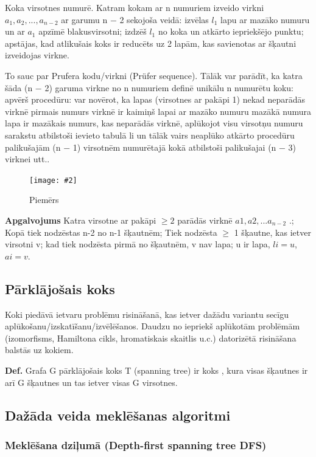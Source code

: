 \documentclass{article}
\newcommand{\illustration}[3]{
	\begin{figure}[H]
		\centering	
		\texttt{[image: \#2]}
		\caption{#3}
	\end{figure}
}
\begin{document}
Koka virsotnes numurē. Katram kokam ar n numuriem izveido virkni $a_1 , a_2 ,...,a_{n−2}$ ar garumu n − 2 sekojoša veidā: izvēlas $l_1$ lapu ar mazāko numuru un ar $a_1$ apzīmē blakusvirsotni; izdzēš $l_1$ no koka un atkārto iepriekšējo punktu; apstājas, kad atlikušais koks ir reducēts uz 2 lapām, kas savienotas ar šķautni izveidojas virkne. 

To sauc par Prufera kodu/virkni (Prüfer sequence).  Tālāk var parādīt, ka katra šāda (n − 2) garuma virkne no n numuriem definē unikālu n numurētu koku: apvērš procedūru: var novērot, ka lapas (virsotnes ar pakāpi 1) nekad neparādās virknē pirmais numurs virknē ir kaimiņš lapai ar mazāko numuru mazākā numura lapa ir mazākais numurs, kas neparādās virknē, aplūkojot visu virsotņu numuru sarakstu atbilstoši ievieto tabulā li un tālāk vairs neaplūko atkārto procedūru palikušajām (n − 1) virsotnēm numurētajā kokā atbilstoši palikušajai (n − 3) virknei utt..

\illustration{1}{Prufers_code-1}{Piemērs}

\textbf{Apgalvojums} Katra virsotne ar pakāpi $\ge 2$ parādās virknē $a1 , a2 , ...a_{n−2}$ .;  Kopā tiek nodzēstas n-2 no n-1 šķautnēm; Tiek nodzēsta $\ge$ 1 šķautne, kas ietver virsotni v; kad tiek nodzēsta pirmā no šķautnēm, v nav lapa; u ir lapa, $li = u$, $ai = v$.

\subsection{Pārklājošais koks}

Koki piedāvā ietvaru problēmu risināšanā, kas ietver dažādu variantu secīgu aplūkošanu/izskatīšanu/izvēlēšanos.  Daudzu no iepriekš aplūkotām problēmām (izomorfisms, Hamiltona cikls, hromatiskais skaitlis u.c.) datorizētā risināšana balstās uz kokiem.

\textbf{Def.}  Grafa G pārklājošais koks T (spanning tree) ir koks , kura visas šķautnes ir arī G šķautnes un tas ietver visas G virsotnes.

\subsection{Dažāda veida meklēšanas algoritmi}

\subsubsection{Meklēšana dziļumā (Depth-first spanning tree DFS)}
\end{document}
